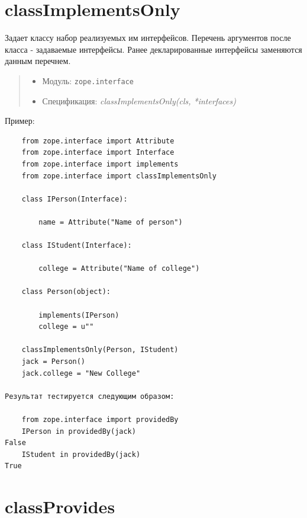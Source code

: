 \documentclass[a4paper,openany,twoside,draft]{book}
\providecommand*{\DUroletitlereference}[1]{\textsl{#1}}
\begin{document}
\section*{classImplementsOnly%
  \label{classimplementsonly}%
}

Задает классу набор реализуемых им интерфейсов.  Перечень аргументов после класса - задаваемые интерфейсы.  Ранее декларированные интерфейсы заменяются данным перечнем.

\begin{quote}

\begin{itemize}

\item Модуль: \texttt{zope.interface}

\item Спецификация: \DUroletitlereference{classImplementsOnly(cls, *interfaces)}

\end{itemize}

\end{quote}

Пример:

\begin{verbatim}
    from zope.interface import Attribute
    from zope.interface import Interface
    from zope.interface import implements
    from zope.interface import classImplementsOnly

    class IPerson(Interface):

        name = Attribute("Name of person")

    class IStudent(Interface):

        college = Attribute("Name of college")

    class Person(object):

        implements(IPerson)
        college = u""

    classImplementsOnly(Person, IStudent)
    jack = Person()
    jack.college = "New College"

Результат тестируется следующим образом:

    from zope.interface import providedBy
    IPerson in providedBy(jack)
False
    IStudent in providedBy(jack)
True
\end{verbatim}


\section*{classProvides%
  \label{classprovides}%
}
\end{document}
